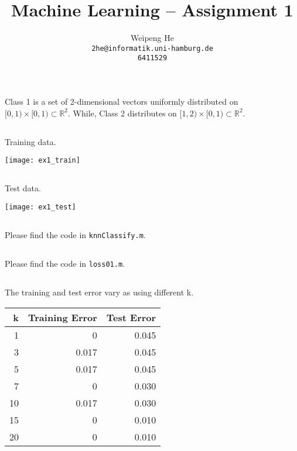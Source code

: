 \documentclass{article}[11pt]
\title{Machine Learning -- Assignment 1}
\author{Weipeng He \\ \texttt{2he@informatik.uni-hamburg.de} \\ \texttt{6411529}}
\begin{document}
\maketitle

\section{}
\subsection{}
Class 1 is a set of 2-dimensional vectors uniformly distributed on $[0, 1) \times [0, 1) \subset \mathbb{R}^2$.
While, Class 2 distributes on $[1, 2) \times [0, 1) \subset \mathbb{R}^2$.

\subsection{}
Training data.
\begin{center}
  \texttt{[image: ex1\_train]}
\end{center}

\subsection{}
Test data.
\begin{center}
  \texttt{[image: ex1\_test]}
\end{center}

\subsection{}
Please find the code in \texttt{knnClassify.m}.

\subsection{}
Please find the code in \texttt{loss01.m}.

\subsection{}
The training and test error vary as using different k.

\begin{center}
\begin{tabular}[h]{r|r|r}
  \hline
  k & Training Error & Test Error \\ \hline
  1 & 0 & 0.045 \\ \hline
  3 & 0.017 & 0.045 \\ \hline
  5 & 0.017 & 0.045 \\ \hline
  7 & 0 & 0.030 \\ \hline
  10 & 0.017 & 0.030 \\ \hline
  15 & 0 & 0.010 \\ \hline
  20 & 0 & 0.010 \\ \hline
\end{tabular}
\end{center}
\end{document}
